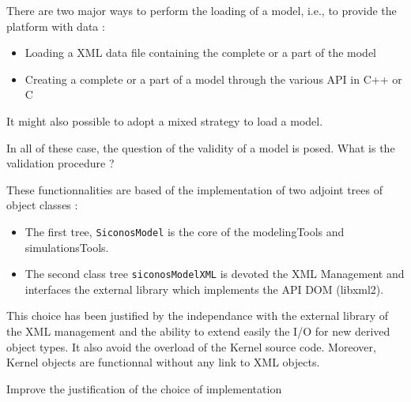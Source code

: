

There are two major ways  to perform the loading of a model, i.e., to provide  the platform with data :
\begin{itemize}
\item Loading a XML data file containing the complete or a part of the model
\item Creating a complete or a part of a model through the various API in C++ or C
\end{itemize}
It might also possible to adopt a mixed strategy to load a model. 


\begin{ndr}
  In all of these case, the question of the validity of a model is  posed. 
What is the validation procedure ?
\end{ndr}

These functionnalities are based of the implementation of two adjoint trees of object classes :
\begin{itemize}
\item The first tree, \texttt{SiconosModel}  is the core of the modelingTools and simulationsTools.
\item The second class tree \texttt{siconosModelXML} is devoted the XML Management and interfaces the external  library which implements the API DOM (libxml2).
\end{itemize}
This choice has been justified by the independance with  the external library of the XML management and the ability to extend easily the I/O for new derived object types. It also avoid the overload of the Kernel source code. Moreover, Kernel objects are functionnal without any link to XML objects.

\begin{ndr}
  Improve the justification of the choice of implementation 
\end{ndr}

